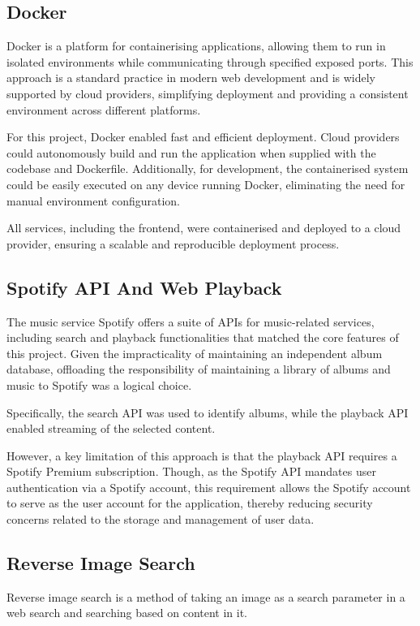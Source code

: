 \subsection{Docker}
Docker is a platform for containerising applications, allowing them to run in isolated environments while communicating through specified exposed ports. This approach is a standard practice in modern web development and is widely supported by cloud providers, simplifying deployment and providing a consistent environment across different platforms.

For this project, Docker enabled fast and efficient deployment. Cloud providers could autonomously build and run the application when supplied with the codebase and Dockerfile. Additionally, for development, the containerised system could be easily executed on any device running Docker, eliminating the need for manual environment configuration.

All services, including the frontend, were containerised and deployed to a cloud provider, ensuring a scalable and reproducible deployment process.

\subsection{Spotify API And Web Playback}
The music service Spotify offers a suite of APIs for music-related services, including search and playback functionalities that matched the core features of this project. Given the impracticality of maintaining an independent album database, offloading the responsibility of maintaining a library of albums and music to Spotify was a logical choice.

Specifically, the search API was used to identify albums, while the playback API enabled streaming of the selected content.

However, a key limitation of this approach is that the playback API requires a Spotify Premium subscription. Though, as the Spotify API mandates user authentication via a Spotify account, this requirement allows the Spotify account to serve as the user account for the application, thereby reducing security concerns related to the storage and management of user data.

\subsection{Reverse Image Search}
Reverse image search is a method of taking an image as a search parameter in a web search and searching based on content in it.

